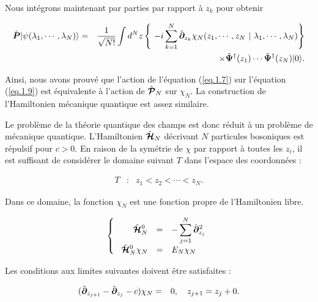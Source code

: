 Nous intégrons maintenant par parties par rapport à $z_k$ pour obtenir

\begin{eqnarray*}
	\operator{P}\vert \psi ( \lambda_1 , \cdots , \lambda_N ) \rangle & = & \frac{1}{ \sqrt{N!}}  \int d^N z 	 \left \{  -i \sum_{k = 1 }^N  \operator{\partial}_{z_k}\chi_N ( z_1 , \cdots , z_N  ~\vert ~ \lambda_1 , \cdots , \lambda _N ) \right \} \\ && \times \operator{\Psi}^\dag(z_1) \cdots \operator{\Psi}^\dag(z_N) \vert 0 \rangle. 
\end{eqnarray*}

Ainsi, nous avons prouvé que l'action de l'équation (\ref{eq.1.7}) sur l'équation (\ref{eq.1.9}) est équivalente à l'action de $\hat{\bm{\mathcal{P}}}_N$ sur \(\chi_N\). La construction de l'Hamiltonien mécanique quantique est assez similaire.

Le problème de la théorie quantique des champs est donc réduit à un problème de mécanique quantique. L'Hamiltonien $\hat{\bm{\mathcal{H}}}_N$ décrivant \(N\) particules bosoniques est répulsif pour \(c > 0\). En raison de la symétrie de \(\chi\) par rapport à toutes les \(z_i\), il est suffisant de considérer le domaine suivant \(T\) dans l'espace des coordonnées :

\begin{eqnarray}
	T & : & z_1 < z_2 < \cdots < z_N \label{eq.1.13}. 
\end{eqnarray}

Dans ce domaine, la fonction \(\chi_N\) est une fonction propre de l'Hamiltonien libre.

\begin{eqnarray}
	\left \{ \begin{array}{rcl} \operator{\mathcal{H}}_N^0 & = & \displaystyle - \sum_{j=1}^N \operator{\partial}_{z_j}^2 \\  \operator{\mathcal{H}}_N^0 \chi_N  & = & E_N \chi_N  \end{array} \right .	\label{eq.1.14}
\end{eqnarray}

Les conditions aux limites suivantes doivent être satisfaites :

\begin{eqnarray}
	( \hat{\bm{\partial}}_{z_{j+1}}	- \hat{\bm{\partial}}_{z_{j}} - c ) \chi_N &= & 0 , \quad z_{j+1} = z_j + 0 .\label{eq.1.15}
\end{eqnarray}


